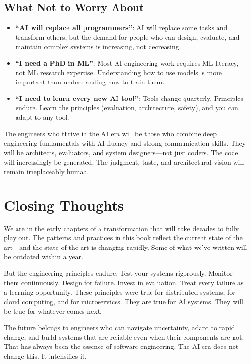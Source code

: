 \subsection{What Not to Worry About}

\begin{itemize}[leftmargin=*]
    \item \textbf{``AI will replace all programmers''}: AI will replace some tasks and transform others, but the demand for people who can design, evaluate, and maintain complex systems is increasing, not decreasing.
    \item \textbf{``I need a PhD in ML''}: Most AI engineering work requires ML literacy, not ML research expertise. Understanding how to use models is more important than understanding how to train them.
    \item \textbf{``I need to learn every new AI tool''}: Tools change quarterly. Principles endure. Learn the principles (evaluation, architecture, safety), and you can adapt to any tool.
\end{itemize}

\begin{keytakeaway}
The engineers who thrive in the AI era will be those who combine deep engineering fundamentals with AI fluency and strong communication skills. They will be architects, evaluators, and system designers---not just coders. The code will increasingly be generated. The judgment, taste, and architectural vision will remain irreplaceably human.
\end{keytakeaway}


\section{Closing Thoughts}

We are in the early chapters of a transformation that will take decades to fully play out. The patterns and practices in this book reflect the current state of the art---and the state of the art is changing rapidly. Some of what we've written will be outdated within a year.

But the engineering principles endure. Test your systems rigorously. Monitor them continuously. Design for failure. Invest in evaluation. Treat every failure as a learning opportunity. These principles were true for distributed systems, for cloud computing, and for microservices. They are true for AI systems. They will be true for whatever comes next.

The future belongs to engineers who can navigate uncertainty, adapt to rapid change, and build systems that are reliable even when their components are not. That has always been the essence of software engineering. The AI era does not change this. It intensifies it.
